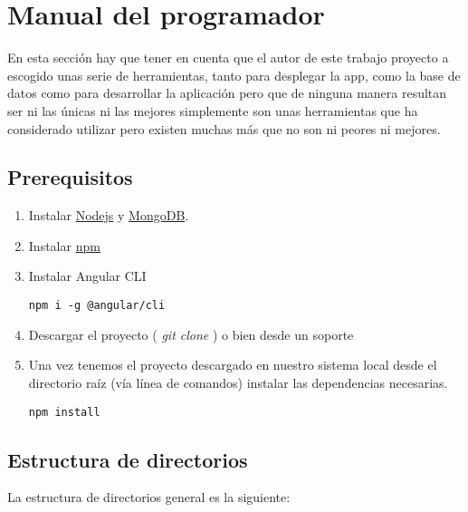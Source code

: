 \section{Manual del programador}
En esta sección hay que tener en cuenta que el autor de este trabajo proyecto a escogido unas serie de herramientas, tanto para desplegar la app, como la base de datos como para desarrollar la aplicación pero que de ninguna manera resultan ser ni las únicas ni las mejores simplemente son unas herramientas que ha considerado utilizar pero existen muchas más que no son ni peores ni mejores.

\subsection{Prerequisitos}
\begin{enumerate}
	\item Instalar \hyperlink{https://nodejs.org/en/}{Nodejs} y \hyperlink{https://www.mongodb.com/}{MongoDB}.
	\item Instalar \hyperlink{https://www.npmjs.com/}{npm}
	\item Instalar Angular CLI
		\lstset{language=C, breaklines=true, basicstyle=\footnotesize}
		\begin{lstlisting}[frame=single]
		npm i -g @angular/cli
    	\end{lstlisting}
    \item Descargar el proyecto ( \emph{git clone} ) o bien desde un soporte
	\item Una vez tenemos el proyecto descargado en nuestro sistema local desde el directorio raíz (vía línea de comandos) instalar las dependencias necesarias.
	\lstset{language=C, breaklines=true, basicstyle=\footnotesize}
		\begin{lstlisting}[frame=single]
		npm install
    	\end{lstlisting}
\end{enumerate}


\subsection{Estructura de directorios }

La estructura de directorios general es la siguiente:



